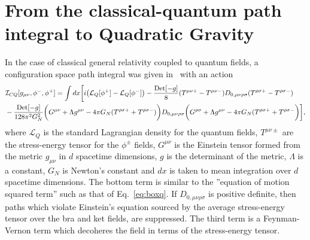 \documentclass[aps,preprintnumbers,superscriptaddress,longbibliography]{revtex4-1}
\begin{document}
\section{From the classical-quantum path integral to Quadratic Gravity}
\label{sec: PIquadratic}


In the case of classical general relativity coupled to quantum fields, a configuration space path integral was given in~\cite{oppenheim2023covariant} with an action 
 \begin{equation}
 \label{eq:PQG-action}
\begin{split}
    &  \mathcal{I}_{CQ}[ g_{\mu \nu}, \phi^-,  \phi^+] =    \int dx \bigg[   i\big(\mathcal{L}_{Q}[\phi^+]  - \mathcal{L}_{Q}[\phi^-]\big)   -\frac{\text{Det}[-g]}{8}( T^{\mu \nu + } - T^{\mu \nu - }) D_{0,\mu \nu \rho \sigma}(T^{\rho \sigma+ } - T^{\rho \sigma- }) \\
    & - \frac{\text{Det}[-g]}{128 \pi^2 G_N^2}\bigg( G^{\mu \nu} +\Lambda g^{\mu\nu} - 4\pi G_N(T^{ \rho \sigma +} + T^{ \rho \sigma -})\bigg) D_{0, \mu \nu \rho \sigma}\bigg( G^{\rho \sigma} +\Lambda g^{\mu\nu} - 4\pi G_N(T^{ \rho \sigma +} + T^{ \rho \sigma -} \bigg)\bigg],
    \end{split}
\end{equation}
where $\mathcal{L}_Q$ is the standard Lagrangian density for the quantum fields, $T^{\mu\nu\pm}$ are the stress-energy tensor for the $\phi^\pm$ fields, $G^{\mu\nu}$ is the Einstein tensor formed from the metric $g_{\mu\nu}$ in $d$ spacetime dimensions, $g$ is the determinant of the metric, $\Lambda$ is a constant, $G_N$ is Newton's constant and $dx$ is taken to mean integration over $d$ spacetime dimensions. The bottom term is similar to the ''equation of motion squared term'' such as that of Eq.~\eqref{eq:boxq}. If $D_{0, \mu \nu \rho \sigma}$ is positive definite, then paths which violate Einstein's equation sourced by the average stress-energy tensor over the bra and ket fields, are suppressed. The third term is a Feynman-Vernon term which decoheres the field in terms of the stress-energy tensor.
\end{document}
